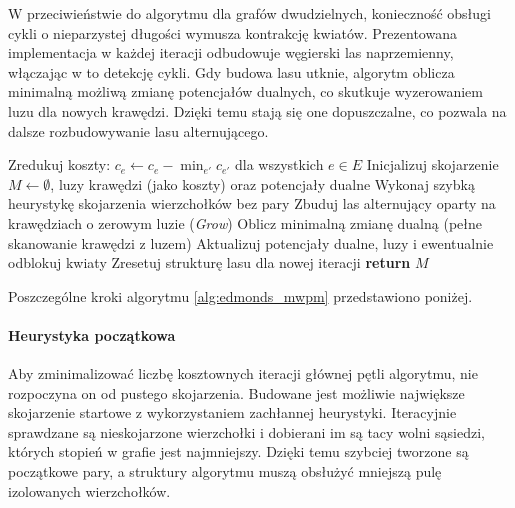 \documentclass{article}
\theoremstyle{definition}
\theoremstyle{plain}
\theoremstyle{remark}
\begin{document}
W przeciwieństwie do algorytmu dla grafów dwudzielnych, konieczność obsługi cykli o nieparzystej długości wymusza kontrakcję kwiatów. Prezentowana implementacja w każdej iteracji odbudowuje węgierski las naprzemienny, włączając w to detekcję cykli. Gdy budowa lasu utknie, algorytm oblicza minimalną możliwą zmianę potencjałów dualnych, co skutkuje wyzerowaniem luzu dla nowych krawędzi. Dzięki temu stają się one dopuszczalne, co pozwala na dalsze rozbudowywanie lasu alternującego.

\begin{algorithm}[H]
    \caption{Algorytm Edmonds'a (MWPM w ujęciu pierwotno-dualnym)}
    \label{alg:edmonds_mwpm}
    \begin{algorithmic}[1]
    \State Zredukuj koszty: $c_e \gets c_e - \min_{e'} c_{e'}$ dla wszystkich $e \in E$
        \State Inicjalizuj skojarzenie $M \gets \emptyset$, luzy krawędzi (jako koszty) oraz potencjały dualne
            \State Wykonaj szybką heurystykę skojarzenia wierzchołków bez pary %
            \State Zbuduj las alternujący oparty na krawędziach o zerowym luzie (\textit{Grow}) 
            \State Oblicz minimalną zmianę dualną (pełne skanowanie krawędzi z luzem) 
            \State Aktualizuj potencjały dualne, luzy i ewentualnie odblokuj kwiaty %
            \State Zresetuj strukturę lasu dla nowej iteracji %
        \EndWhile
        \State \textbf{return} $M$
    \end{algorithmic}
\end{algorithm}

\noindent
Poszczególne kroki algorytmu \ref{alg:edmonds_mwpm} przedstawiono poniżej.

\paragraph{Heurystyka początkowa}
Aby zminimalizować liczbę kosztownych iteracji głównej pętli algorytmu, nie rozpoczyna on od pustego skojarzenia. Budowane jest możliwie największe skojarzenie startowe z wykorzystaniem zachłannej heurystyki. Iteracyjnie sprawdzane są nieskojarzone wierzchołki i dobierani im są tacy wolni sąsiedzi, których stopień w grafie jest najmniejszy. Dzięki temu szybciej tworzone są początkowe pary, a struktury algorytmu muszą obsłużyć mniejszą pulę izolowanych wierzchołków.
\end{document}
